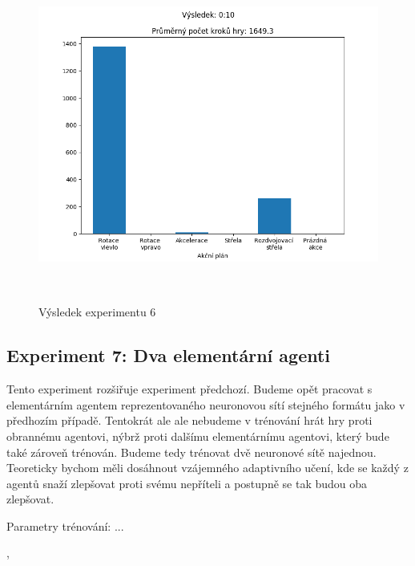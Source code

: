 \begin{figure}[p]\centering
\includegraphics[width=145mm, height=110mm]{./Obrazky/Experiment05Results.png}
\caption{Výsledek experimentu 6}
\label{Výsledek experimentu 06}
\end{figure}
    



\subsection{Experiment 7: Dva elementární agenti}
Tento experiment rozšiřuje experiment předchozí. Budeme opět pracovat s elementárním agentem reprezentovaného neuronovou sítí stejného formátu jako v předhozím případě.
Tentokrát ale ale nebudeme v trénování hrát hry proti obrannému agentovi, nýbrž proti dalšímu elementárnímu agentovi, který bude také zároveň trénován.
Budeme tedy trénovat dvě neuronové sítě najednou. Teoreticky bychom měli dosáhnout vzájemného adaptivního učení, kde se každý z agentů snaží zlepšovat proti svému nepříteli a postupně se tak budou oba zlepšovat.
\par
Parametry trénování: ... 




,